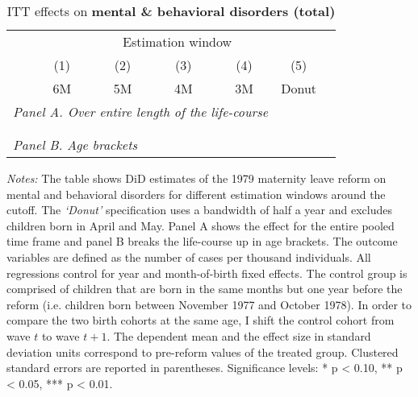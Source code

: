 \vspace*{\fill}
\begin{table}[H] \centering 
 \begin{threeparttable} \centering \caption{ITT effects on \textbf{mental \& behavioral disorders (total)}}\label{tab_mlch: DD_d5_total}
  {\def\sym#1{\ifmmode^{#1}\else\(^{#1}\)\fi} 
 	\begin{tabular}{l*{6}{c}}
 		\toprule 
 		& \multicolumn{5}{c}{Estimation window} \\ 
 		\cmidrule(lr){2-6}
 		&\multicolumn{1}{c}{(1)}&\multicolumn{1}{c}{(2)}&\multicolumn{1}{c}{(3)}&\multicolumn{1}{c}{(4)}&\multicolumn{1}{c}{(5)}\\
 		&\multicolumn{1}{c}{6M}&\multicolumn{1}{c}{5M}&\multicolumn{1}{c}{4M}&\multicolumn{1}{c}{3M}&\multicolumn{1}{c}{Donut}\\
 		\midrule
 		\multicolumn{5}{l}{\emph{Panel A. Over entire length of the life-course}} \\
 		 \\ \\
 		\multicolumn{5}{l}{\emph{Panel B. Age brackets}} \\
 		    
 		\bottomrule 
 	\end{tabular}}
 	\begin{tablenotes} 
 		\item \scriptsize \emph{Notes:} The table shows DiD estimates of the 1979 maternity leave reform on mental and behavioral disorders for different estimation windows around the cutoff. The \textit{`Donut'} specification uses a bandwidth of half a year and excludes children born in April and May. Panel A shows the effect for the entire pooled time frame and panel B breaks the life-course up in age brackets. The outcome variables are defined as the number of cases per thousand individuals. All regressions control for year and month-of-birth fixed effects. The control group is comprised of children that are born in the same months but one year before the reform (i.e. children born between November 1977 and October 1978). In order to compare the two birth cohorts at the same age, I shift the control cohort from wave $t$ to wave $t+1$. The dependent mean and the effect size in standard deviation units correspond to pre-reform values of the treated group. Clustered standard errors are reported in parentheses. \newline Significance levels: * p < 0.10, ** p < 0.05, *** p < 0.01. \newline 	%
 	\end{tablenotes} 
 \end{threeparttable} 
 \end{table}
\vspace*{\fill}\clearpage 